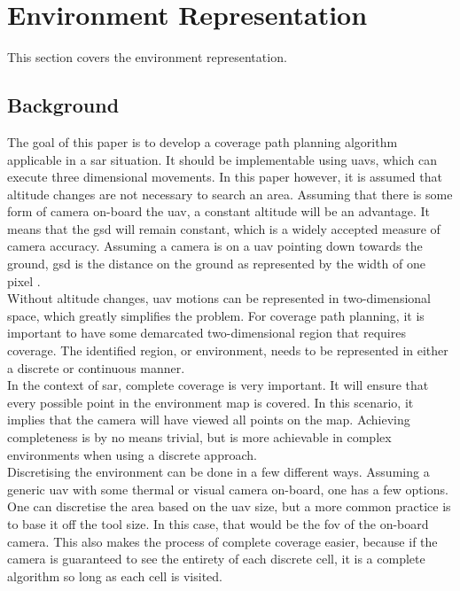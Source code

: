 \chapter{Environment Representation}
\label{chp:ER}
This section covers the environment representation. 
\section{Background}
The goal of this paper is to develop a coverage path planning algorithm \hbox{applicable} in a \acl{sar} situation. It should be implementable using \acsp{uav}, which can execute three dimensional movements. In this paper however, it is assumed that altitude changes are not necessary to search an area. Assuming that there is some form of camera on-board the \acs{uav}, a constant altitude will be an advantage. It means that the \acf{gsd} will remain constant, which is a widely accepted measure of camera accuracy. Assuming a camera is on a \acs{uav} pointing down towards the ground, \acs{gsd} is the distance on the ground as represented by the width of one pixel \cite{PropellerAero2021}.\\
Without altitude changes, \acs{uav} motions can be represented in two-dimensional space, which greatly simplifies the problem. For coverage path planning, it is important to have some demarcated two-dimensional region that requires coverage. The identified region, or environment, needs to be represented in either a discrete or continuous manner. \\
In the context of \acs{sar}, complete coverage is very important. It will ensure that every possible point in the environment map is covered. In this scenario, it implies that the camera will have viewed all points on the map. Achieving completeness is by no means trivial, but is more achievable in complex environments when using a discrete approach. \\
Discretising the environment can be done in a few different ways. Assuming a generic \acs{uav} with some thermal or visual camera on-board, one has a few options. One can discretise the area based on the \acs{uav} size, but a more common practice is to base it off the tool size. In this case, that would be the \acf{fov} of the on-board camera. This also makes the process of complete coverage easier, because if the camera is guaranteed to see the entirety of each discrete cell, it is a complete algorithm so long as each cell is visited.\\
